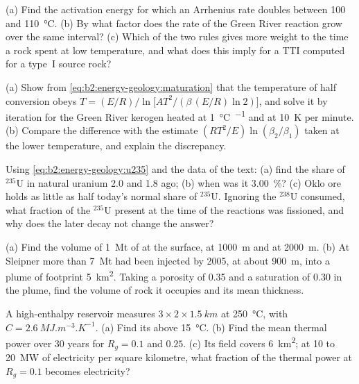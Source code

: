 \begin{exercise}[$\star\star$]\label{exo:b2:energy-geology:5}
(a) Find the activation energy for which an Arrhenius rate doubles between 100 and
\qty{110}{\celsius}. (b) By what factor does the rate of the Green River reaction grow over the same
interval? (c) Which of the two rules gives more weight to the time a rock spent at low temperature,
and what does this imply for a TTI computed for a type~I source rock?
\end{exercise}

\begin{exercise}[$\star\star$]\label{exo:b2:energy-geology:6}
(a) Show from \eqref{eq:b2:energy-geology:maturation} that the temperature of half conversion obeys
$T = (E/R)\big/\ln\bigl[A T^2/(\beta\,(E/R)\ln 2)\bigr]$, and solve it by iteration for the Green
River kerogen heated at \qty{1}{\celsius\per\Myr} and at \qty{10}{K} per minute. (b) Compare the
difference with the estimate $(RT^2/E)\ln(\beta_2/\beta_1)$ taken at the lower temperature, and
explain the discrepancy.
\end{exercise}

\begin{exercise}[$\star\star$]\label{exo:b2:energy-geology:7}
Using \eqref{eq:b2:energy-geology:u235} and the data of the text: (a) find the share of $^{235}$U in
natural uranium \qty{2.0}{\Ga} and \qty{1.8}{\Ga} ago; (b) when was it \qty{3.00}{\percent}?
(c) Oklo ore holds as little as half today's normal share of $^{235}$U. Ignoring the $^{238}$U
consumed, what fraction of the $^{235}$U present at the time of the reactions was fissioned, and
why does the later decay not change the answer?
\end{exercise}

\begin{exercise}[$\star\star$]\label{exo:b2:energy-geology:8}
(a) Find the volume of \qty{1}{Mt} of  at the surface, at \qty{1000}{m} and at
\qty{2000}{m}. (b) At Sleipner more than \qty{7}{Mt} had been injected by 2005, at about
\qty{900}{m}, into a plume of footprint \qty{5}{km^2}. Taking a porosity of 0.35 and a 
saturation of 0.30 in the plume, find the volume of rock it occupies and its mean thickness.
\end{exercise}

\begin{exercise}[$\star\star$]\label{exo:b2:energy-geology:9}
A high-enthalpy reservoir measures $3 \times 2 \times \qty{1.5}{km}$ at \qty{250}{\celsius}, with
$C = \qty{2.6}{MJ.m^{-3}.K^{-1}}$. (a) Find its  above \qty{15}{\celsius}. (b) Find the
mean thermal power over 30 years for $R_g = 0.1$ and $0.25$. (c) Its field covers \qty{6}{km^2};
at 10 to \qty{20}{MW} of electricity per square kilometre, what fraction of the thermal power at
$R_g = 0.1$ becomes electricity?
\end{exercise}

